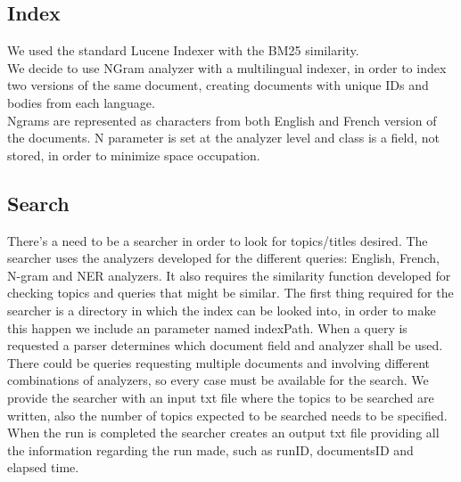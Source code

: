 \subsection{Index}\label{subsec:index}
We used the standard Lucene Indexer with the BM25\cite{BM25} similarity.\\
We decide to use NGram analyzer with a multilingual indexer,
in order to index two versions of the same document, creating documents with
unique IDs and bodies from each language.\\
Ngrams are represented as characters from both English and French version of
the documents. N parameter is set at the analyzer level and class is a field,
not stored, in order to minimize space occupation.\\

\subsection{Search}\label{subsec:search}
There's a need to be a searcher in order to look for topics/titles desired. The searcher uses the analyzers developed for the different queries: English, French, N-gram and NER analyzers. It also requires the similarity function developed for checking topics and queries that might be similar. The first thing required for the searcher is a directory in which the index can be looked into, in order to make this happen we include an parameter named indexPath. When a query is requested a parser determines which document field and analyzer shall be used. There could be queries requesting multiple documents and involving different combinations of analyzers, so every case must be available for the search. We provide the searcher with an input txt file where the topics to be searched are written, also the number of topics expected to be searched needs to be specified. When the run is completed the searcher creates an output txt file providing all the information regarding the run made, such as runID, documentsID and elapsed time.

